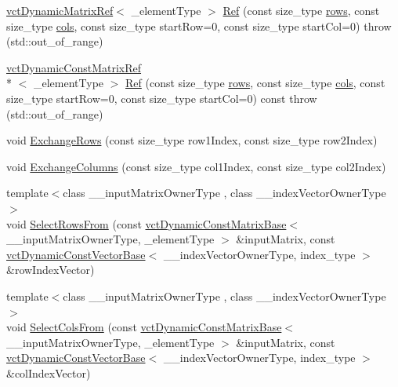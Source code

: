 {\bf }\par
\begin{DoxyCompactItemize}
\item 
\hyperlink{classvct_dynamic_matrix_ref}{vct\-Dynamic\-Matrix\-Ref}$<$ \-\_\-element\-Type $>$ \hyperlink{classvct_dynamic_matrix_base_a5421aa9371a5053340682cec897c0412}{Ref} (const size\-\_\-type \hyperlink{classvct_dynamic_const_matrix_base_a5eac13be2207ebeb8766cde379d73438}{rows}, const size\-\_\-type \hyperlink{classvct_dynamic_const_matrix_base_aa6c51d41a100da49a7e7ac7edb20ecd9}{cols}, const size\-\_\-type start\-Row=0, const size\-\_\-type start\-Col=0)  throw (std\-::out\-\_\-of\-\_\-range)
\item 
\hyperlink{classvct_dynamic_const_matrix_ref}{vct\-Dynamic\-Const\-Matrix\-Ref}\\*
$<$ \-\_\-element\-Type $>$ \hyperlink{classvct_dynamic_matrix_base_af5700b825866845ba8b20b182f822e5c}{Ref} (const size\-\_\-type \hyperlink{classvct_dynamic_const_matrix_base_a5eac13be2207ebeb8766cde379d73438}{rows}, const size\-\_\-type \hyperlink{classvct_dynamic_const_matrix_base_aa6c51d41a100da49a7e7ac7edb20ecd9}{cols}, const size\-\_\-type start\-Row=0, const size\-\_\-type start\-Col=0) const   throw (std\-::out\-\_\-of\-\_\-range)
\end{DoxyCompactItemize}

{\bf }\par
\begin{DoxyCompactItemize}
\item 
void \hyperlink{classvct_dynamic_matrix_base_a7c644d6c39bb725b915da36787d7e95a}{Exchange\-Rows} (const size\-\_\-type row1\-Index, const size\-\_\-type row2\-Index)
\item 
void \hyperlink{classvct_dynamic_matrix_base_ab6745c494fb3da5cfc1aa6027fc10e55}{Exchange\-Columns} (const size\-\_\-type col1\-Index, const size\-\_\-type col2\-Index)
\item 
{\footnotesize template$<$class \-\_\-\-\_\-input\-Matrix\-Owner\-Type , class \-\_\-\-\_\-index\-Vector\-Owner\-Type $>$ }\\void \hyperlink{classvct_dynamic_matrix_base_ae24612ba0e98aa1474d1e8c891107dff}{Select\-Rows\-From} (const \hyperlink{classvct_dynamic_const_matrix_base}{vct\-Dynamic\-Const\-Matrix\-Base}$<$ \-\_\-\-\_\-input\-Matrix\-Owner\-Type, \-\_\-element\-Type $>$ \&input\-Matrix, const \hyperlink{classvct_dynamic_const_vector_base}{vct\-Dynamic\-Const\-Vector\-Base}$<$ \-\_\-\-\_\-index\-Vector\-Owner\-Type, index\-\_\-type $>$ \&row\-Index\-Vector)
\item 
{\footnotesize template$<$class \-\_\-\-\_\-input\-Matrix\-Owner\-Type , class \-\_\-\-\_\-index\-Vector\-Owner\-Type $>$ }\\void \hyperlink{classvct_dynamic_matrix_base_a03fc07021cd25f8e3a86673718724570}{Select\-Cols\-From} (const \hyperlink{classvct_dynamic_const_matrix_base}{vct\-Dynamic\-Const\-Matrix\-Base}$<$ \-\_\-\-\_\-input\-Matrix\-Owner\-Type, \-\_\-element\-Type $>$ \&input\-Matrix, const \hyperlink{classvct_dynamic_const_vector_base}{vct\-Dynamic\-Const\-Vector\-Base}$<$ \-\_\-\-\_\-index\-Vector\-Owner\-Type, index\-\_\-type $>$ \&col\-Index\-Vector)
\end{DoxyCompactItemize}

